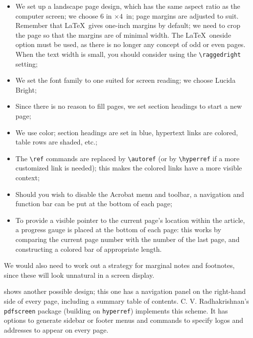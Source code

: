 \begin{itemize}
  \item We set up a landscape page design, which has the same aspect ratio
    as the computer screen; we choose 6 in $\times 4$\ in; page margins
    are adjusted to suit. Remember that \LaTeX\  gives one-inch margins by
    default; we need to crop the page so that the margins are of minimal
    width. The \LaTeX\  oneside option must be used, as there is no longer
    any concept of odd or even pages. When the text width is small, you
    should consider using the \verb|\raggedright| setting; 
  \item We set the font family to one suited for screen reading; we choose Lucida 
    Bright; 
  \item Since there is no reason to fill pages, we set section headings to start a new 
    page;
  \item We use color; section headings are set in blue, hypertext links are colored, table 
    rows are shaded, etc.; 
  \item The \verb|\ref| commands are replaced by \verb|\autoref| (or by \verb|\hyperref| if a more 
    customized link is needed); this makes the colored links have a more visible 
    context; 
  \item  Should you wish to disable the Acrobat menu and toolbar, a navigation and 
    function bar can be put at the bottom of each page; 
  \item To provide a visible pointer to the current page's location within the article, a 
    progress gauge is placed at the bottom of each page: this works by comparing 
    the current page number with the number of the last page, and constructing a 
    colored bar of appropriate length. 
\end{itemize}

We would also need to work out a strategy for marginal notes and footnotes, since 
these will look unnatural in a screen display. 

 shows another possible design; this one has a navigation
panel on the right-hand side of every page, including a summary table of
contents. C. V. Radhakrishnan's \verb|pdfscreen| package (building on
\verb|hyperref|) implements this scheme.  It has options to generate
sidebar or footer menus and commands to specify logos and addresses to
appear on every page. 

 
